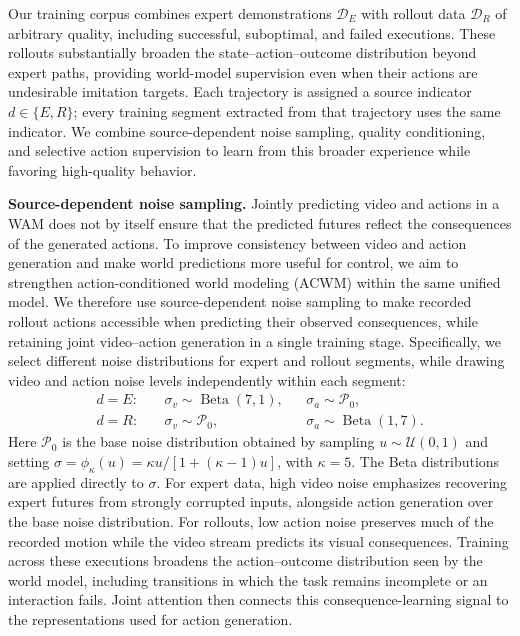 Our training corpus combines expert demonstrations $\mathcal D_E$ with rollout data $\mathcal D_R$ of arbitrary quality, including successful, suboptimal, and failed executions.
These rollouts substantially broaden the state--action--outcome distribution beyond expert paths, providing world-model supervision even when their actions are undesirable imitation targets.
Each trajectory is assigned a source indicator $d\in\{E,R\}$; every training segment extracted from that trajectory uses the same indicator.
We combine source-dependent noise sampling, quality conditioning, and selective action supervision to learn from this broader experience while favoring high-quality behavior.

\textbf{Source-dependent noise sampling.}
\label{sec:noise_sampling}
Jointly predicting video and actions in a WAM does not by itself ensure that the predicted futures reflect the consequences of the generated actions.
To improve consistency between video and action generation and make world predictions more useful for control, we aim to strengthen action-conditioned world modeling (ACWM) within the same unified model.
We therefore use source-dependent noise sampling to make recorded rollout actions accessible when predicting their observed consequences, while retaining joint video--action generation in a single training stage.
Specifically, we select different noise distributions for expert and rollout segments, while drawing video and action noise levels independently within each segment:
\begin{equation}
\begin{aligned}
    d=E:&\quad \sigma_v\sim\operatorname{Beta}(7,1),
                 &&\sigma_a\sim\mathcal P_0,\\
    d=R:&\quad \sigma_v\sim\mathcal P_0,
                 &&\sigma_a\sim\operatorname{Beta}(1,7).
\end{aligned}
\label{eq:source_noise}
\end{equation}
Here $\mathcal P_0$ is the base noise distribution obtained by sampling $u\sim\mathcal U(0,1)$ and setting $\sigma=\phi_\kappa(u)=\kappa u/[1+(\kappa-1)u]$, with $\kappa=5$.
The Beta distributions~\citep{johnson1995continuous} are applied directly to $\sigma$.
For expert data, high video noise emphasizes recovering expert futures from strongly corrupted inputs, alongside action generation over the base noise distribution.
For rollouts, low action noise preserves much of the recorded motion while the video stream predicts its visual consequences.
Training across these executions broadens the action--outcome distribution seen by the world model, including transitions in which the task remains incomplete or an interaction fails.
Joint attention then connects this consequence-learning signal to the representations used for action generation.

